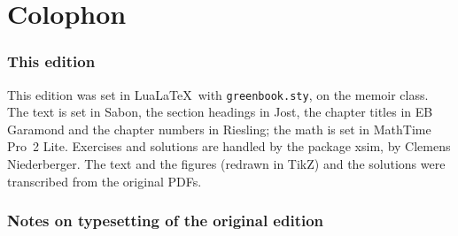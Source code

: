 \chapter*{Colophon}

\subsection*{This edition}

This edition was set in Lua\LaTeX\ with \texttt{greenbook.sty}, on the memoir
class. The text is set in Sabon, the section headings in Jost, the chapter
titles in EB Garamond and the chapter numbers in Riesling; the math is set in
MathTime Pro~2 Lite. Exercises and solutions are handled by the package xsim,
by Clemens Niederberger. The text and the figures (redrawn in TikZ) and the
solutions were transcribed from the original PDFs.

\subsection*{Notes on typesetting of the original edition}

